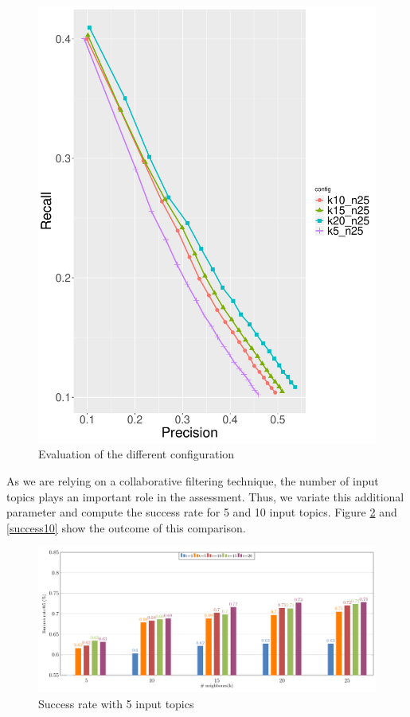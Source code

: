 \begin{figure}[t!]
	\centering
	\includegraphics[width=\linewidth]{figs/PrecisionRecallCurve.pdf}
	\caption{Evaluation of the different configuration}
	\label{fig:configs}
\end{figure}


As we are relying on a collaborative filtering technique, the number of input topics plays an important role in the assessment. Thus, we variate this additional parameter and compute the success rate for 5 and 10 input topics. Figure \ref{fig:success5} and \ref{success10} show the outcome of this comparison.  

\begin{figure}[t!]
	\centering
	\includegraphics[width=\linewidth]{figs/successRateN@5.pdf}
	\caption{Success rate with 5 input topics}
	\label{fig:success5}
\end{figure}


